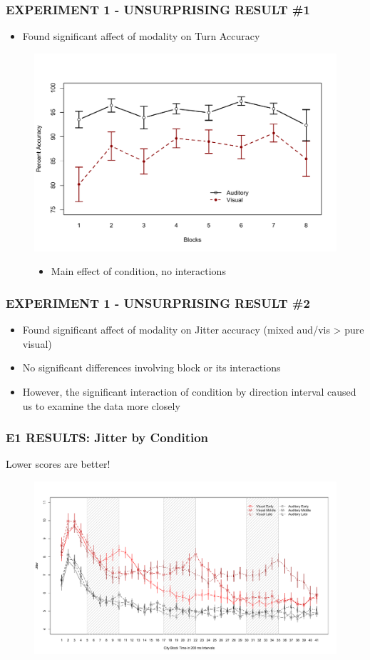\documentclass{beamer}
\begin{document}
\begin{frame}
	\frametitle{EXPERIMENT 1 - UNSURPRISING RESULT \#1}
	\begin{itemize}
		\item Found significant affect of modality on Turn Accuracy
	\end{itemize}
	\begin{figure}
		\centering
		\includegraphics[width=.8\textwidth]{../zNvBkFigs/Rplot_E1_acc_CondByBlks}
		\begin{itemize}
			\item Main effect of condition, no interactions
		\end{itemize}
	\end{figure}
\end{frame}

\begin{frame}
	\frametitle{EXPERIMENT 1 - UNSURPRISING RESULT \#2}
	\begin{itemize}
		\item Found significant affect of modality on Jitter accuracy (mixed aud/vis > pure visual)
		\item No significant differences involving block or its interactions
		\pause
		\item However, the significant interaction of condition by direction interval caused us to examine the data more closely
	\end{itemize}
\end{frame}

\begin{frame} 
	\frametitle{E1 RESULTS: Jitter by Condition}
	Lower scores are better!
	\begin{figure}
		\centering
		\includegraphics[width=1\textwidth]{../zNvBkFigs/Rplot-e1jit41-best-110730}
	\end{figure}
\end{frame}
\end{document}

